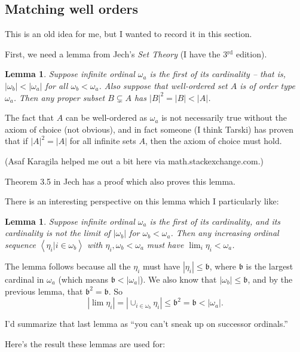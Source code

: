 \documentclass[11pt]{amsart}
\newtheorem{Lemma}[Def]{Lemma}
\newcommand{\up}[1]{\ensuremath{^{\textrm{#1}}}}
\begin{document}
\subsection{Matching well orders}

This is an old idea for me, but I wanted to record it in this section.

First, we need a lemma from Jech's {\em Set Theory} (I have the 3\up{rd} edition).

\begin{Lemma}\label{b_squared_is_b_lemma}
Suppose infinite ordinal $\omega_a$ is the first  of its cardinality -- that is, $|\omega_b| < |\omega_a|$
for all $\omega_b < \omega_a$.
Also suppose that well-ordered set $A$ is of order type $\omega_a$. Then any
proper subset $B \subsetneq A$ has $|B|^2 = |B| < |A|$.
\end{Lemma}

The fact that $A$ can be well-ordered as $\omega_a$ is not necessarily true without
the axiom of choice (not obvious), and in fact someone (I think Tarski) has proven that
if $|A|^2=|A|$ for all infinite sets $A$, then the axiom of choice must hold.

(Asaf Karagila helped me out a bit here via math.stackexchange.com.)

Theorem 3.5 in Jech has a proof which also proves this lemma.

There is an interesting perspective on this lemma which I particularly like:

\begin{Lemma}
Suppose infinite ordinal $\omega_a$ is the first  of its cardinality, and its
cardinality is not the limit of $|\omega_b|$ for $\omega_b < \omega_a$.
Then any increasing ordinal sequence $\left< \eta_i | i \in \omega_b \right>$
with $\eta_i, \omega_b < \omega_a$ must have $\lim_i \eta_i < \omega_a$.
\end{Lemma}

The lemma follows because all the $\eta_i$ must have $|\eta_i| \le \mathfrak b$,
where $\mathfrak b$ is the largest cardinal in $\omega_a$ (which means
$\mathfrak b < |\omega_a|$).
We also know that $|\omega_b| \le \mathfrak b$,
and by the previous lemma, that $\mathfrak b^2 = \mathfrak b$. So
$$ | \lim \eta_i | = | \cup_{i\in\omega_b} \eta_i | \le \mathfrak b^2 = \mathfrak b < |\omega_a|.$$

I'd summarize that last lemma as ``you can't sneak up on successor ordinals.''

Here's the result these lemmas are used for:
\end{document}

